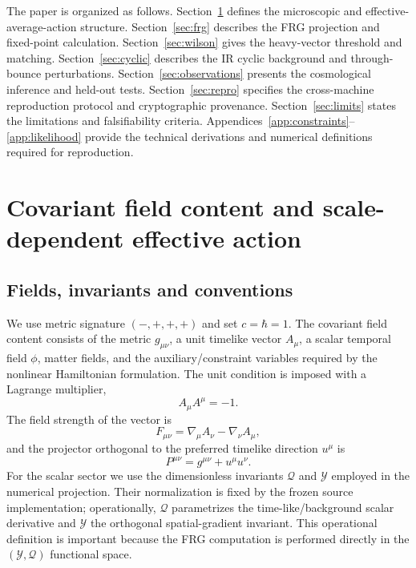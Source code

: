 \documentclass[12pt]{iopart}
\newcommand{\Q}{\mathcal Q}
\newcommand{\Y}{\mathcal Y}
\begin{document}
The paper is organized as follows.  Section~\ref{sec:theory} defines the microscopic and effective-average-action structure.  Section~\ref{sec:frg} describes the FRG projection and fixed-point calculation.  Section~\ref{sec:wilson} gives the heavy-vector threshold and matching.  Section~\ref{sec:cyclic} describes the IR cyclic background and through-bounce perturbations.  Section~\ref{sec:observations} presents the cosmological inference and held-out tests.  Section~\ref{sec:repro} specifies the cross-machine reproduction protocol and cryptographic provenance.  Section~\ref{sec:limits} states the limitations and falsifiability criteria.  Appendices~\ref{app:constraints}--\ref{app:likelihood} provide the technical derivations and numerical definitions required for reproduction.

\section{Covariant field content and scale-dependent effective action}
\label{sec:theory}

\subsection{Fields, invariants and conventions}

We use metric signature $(-,+,+,+)$ and set $c=\hbar=1$.  The covariant field content consists of the metric $g_{\mu\nu}$, a unit timelike vector $A_\mu$, a scalar temporal field $\phi$, matter fields, and the auxiliary/constraint variables required by the nonlinear Hamiltonian formulation.  The unit condition is imposed with a Lagrange multiplier,
\begin{equation}
 A_\mu A^\mu=-1.
\label{eq:unit}
\end{equation}
The field strength of the vector is
\begin{equation}
 F_{\mu\nu}=\nabla_\mu A_\nu-\nabla_\nu A_\mu,
\end{equation}
and the projector orthogonal to the preferred timelike direction $u^\mu$ is
\begin{equation}
 P^{\mu\nu}=g^{\mu\nu}+u^\mu u^\nu.
\label{eq:projector}
\end{equation}
For the scalar sector we use the dimensionless invariants $\Q$ and $\Y$ employed in the numerical projection.  Their normalization is fixed by the frozen source implementation; operationally, $\Q$ parametrizes the time-like/background scalar derivative and $\Y$ the orthogonal spatial-gradient invariant.  This operational definition is important because the FRG computation is performed directly in the $(\Y,\Q)$ functional space.
\end{document}
